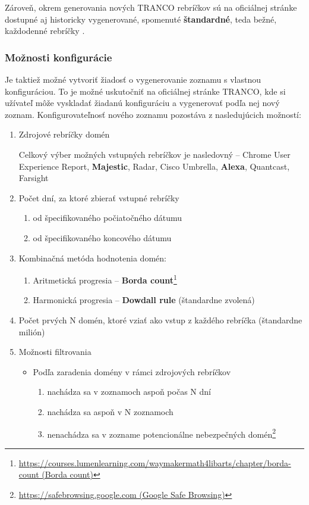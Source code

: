 Zároveň, okrem generovania nových TRANCO rebríčkov sú na oficiálnej stránke dostupné aj historicky vygenerované, spomenuté \textbf{štandardné}, teda bežné, každodenné rebríčky \cite{tranco-homepage}.

\subsubsection{Možnosti konfigurácie}
\label{tranco-config}

Je taktiež možné vytvoriť žiadosť o vygenerovanie zoznamu s vlastnou konfiguráciou. 
To je možné uskutočniť na oficiálnej stránke TRANCO,
kde si užívateľ môže vyskladať žiadanú konfiguráciu a vygenerovať podľa nej nový zoznam.
Konfigurovateľnosť nového zoznamu pozostáva z nasledujúcich možností: \cite{tranco-config}
\begin{enumerate}
    \item Zdrojové rebríčky domén
    
    Celkový výber možných vstupných rebríčkov je nasledovný -- Chrome User Experience Report, \textbf{Majestic}, Radar, Cisco Umbrella, \textbf{Alexa}, Quantcast, Farsight
    
    \item Počet dní, za ktoré zbierať vstupné rebríčky
    \begin{enumerate}
        \item od špecifikovaného počiatočného dátumu
        \item od špecifikovaného koncového dátumu
    \end{enumerate}

    \item Kombinačná metóda hodnotenia domén:
    \begin{enumerate}
        \item Aritmetická progresia -- \textbf{Borda count}\footnote{\href{https://courses.lumenlearning.com/waymakermath4libarts/chapter/borda-count}{https://courses.lumenlearning.com/waymakermath4libarts/chapter/borda-count (Borda count)}}
        \item Harmonická progresia -- \textbf{Dowdall rule} (štandardne zvolená)
    \end{enumerate}

    \item Počet prvých N domén, ktoré vziať ako vstup z každého rebríčka (štandardne milión)

    \item Možnosti filtrovania
    \begin{itemize}
        \item Podľa zaradenia domény v rámci zdrojových rebríčkov
        \begin{enumerate}
            \item nachádza sa v zoznamoch aspoň počas N dní
            \item nachádza sa aspoň v N zoznamoch
            \item nenachádza sa v zozname potencionálne nebezpečných domén\footnote{\href{https://safebrowsing.google.com}{https://safebrowsing.google.com (Google Safe Browsing)}}
        \end{enumerate}


\end{itemize}
\end{enumerate}
